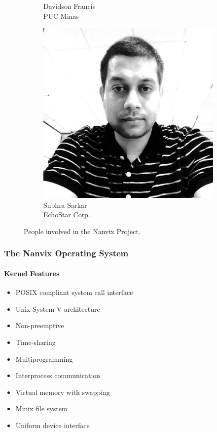 \documentclass{beamer}
\begin{document}
\begin{frame}
\begin{figure}[t]
\begin{subfigure}{0.2\linewidth}
						\caption{\scriptsize{Davidson Francis\\PUC Minas}}
					\end{subfigure}
					\quad
					\quad
					\begin{subfigure}{0.2\linewidth}
						\includegraphics[width=\linewidth]{subhra}
						\caption{\scriptsize{Subhra Sarkar\\EchoStar Corp.}}
					\end{subfigure}
				\caption{People involved in the Nanvix Project.}
			\end{figure}
		\end{frame}

		\begin{frame}
		\frametitle{The Nanvix Operating System}
		\framesubtitle{Kernel Features}
			\begin{itemize}
			\setlength\itemsep{0.7em}
				\item POSIX compliant system call interface
				\item Unix System V architecture
				\item Non-preemptive
				\item Time-sharing
				\item Multiprogramming
				\item Interprocess communication
				\item Virtual memory with swapping
				\item Minix file system
				\item Uniform device interface
			\end{itemize}
		\end{frame}
\end{document}
